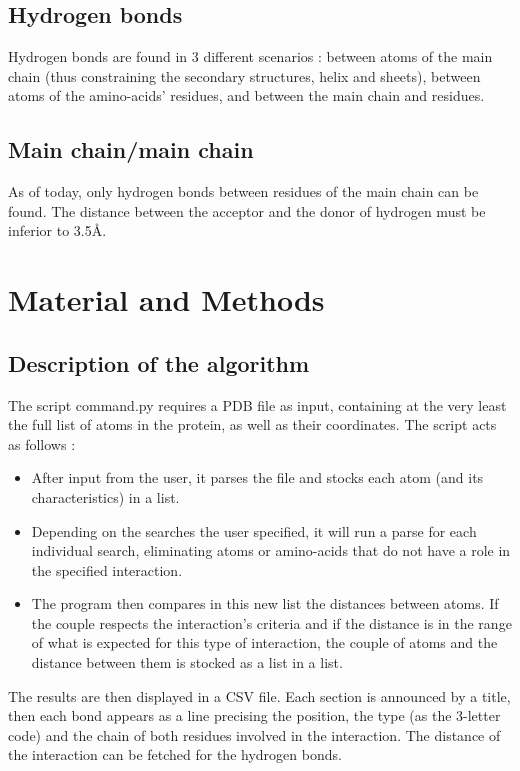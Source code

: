 \documentclass[]{article}
\begin{document}
\subsection{Hydrogen bonds}
Hydrogen bonds are found in 3 different scenarios : between atoms of the main chain (thus constraining the secondary structures, helix and sheets), between atoms of the amino-acids' residues, and between the main chain and residues.
\subsection{Main chain/main chain}
As of today, only hydrogen bonds between residues of the main chain can be found.
The distance between the acceptor and the donor of hydrogen must be inferior to 3.5\si{\angstrom}.

\section{Material and Methods}
\subsection{Description of the algorithm}
The script command.py requires a PDB file as input, containing at the very least the full list of atoms in the protein, as well as their coordinates.
The script acts as follows :
\begin{itemize}
	\item After input from the user, it parses the file and stocks each atom (and its characteristics) in a list.
	\item Depending on the searches the user specified, it will run a parse for each individual search, eliminating atoms or amino-acids that do not have a role in the specified interaction.
	\item The program then compares in this new list the distances between atoms. If the couple respects the interaction's criteria and if the distance is in the range of what is expected for this type of interaction, the couple of atoms and the distance between them is stocked as a list in a list.
\end{itemize}

The results are then displayed in a CSV file.
Each section is announced by a title, then each bond appears as a line precising the position, the type (as the 3-letter code) and the chain of both residues involved in the interaction.
The distance of the interaction can be fetched for the hydrogen bonds.
\end{document}
